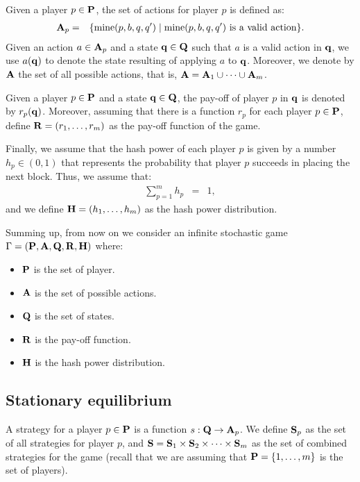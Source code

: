 \documentclass{article}
\begin{document}
Given a player $p \in \mathbf{P}$, the set of actions for player $p$ is defined as:
\begin{eqnarray*}
\mathbf{A}_p & = & \{ \text{mine}(p,b,q,q') \mid \text{mine}(p,b,q,q') \text{ is a valid action}\}.
\end{eqnarray*}
Given an action $a \in \mathbf{A}_p$ and a state $\mathbf{q} \in \mathbf{Q}$ such that $a$ is a valid action in $\mathbf{q}$, we use $a(\mathbf{q})$ to denote the state resulting of applying $a$ to $\mathbf{q}$. Moreover, we denote by $\mathbf{A}$ the set of all possible actions, that is, $\mathbf{A} = \mathbf{A}_1 \cup \cdots \cup \mathbf{A}_m$.

Given a player $p \in \mathbf{P}$ and a state $\mathbf{q} \in \mathbf{Q}$, the pay-off of player $p$ in $\mathbf{q}$ is denoted by $r_p(\mathbf{q})$. Moreover, assuming that there is a  function $r_p$ for each player $p \in \mathbf{P}$, define $\mathbf{R} = (r_1, \ldots, r_m)$ as the pay-off function of the game.

Finally, we assume that the hash power of each player $p$ is given by a number $h_p \in (0,1)$ that represents the probability that player $p$ succeeds in placing the next block. Thus, we assume that:
\begin{eqnarray*}
\sum_{p=1}^m h_p & = &  1, 
\end{eqnarray*}and we define $\mathbf{H} = (h_1, \ldots, h_m)$ as the hash power distribution.


Summing up, from now on we consider an infinite stochastic game $\Gamma = (\mathbf{P},\mathbf{A},\mathbf{Q},\mathbf{R},\mathbf{H})$ where:
\begin{itemize}
	\item $\mathbf{P}$ is the set of player.
	\item $\mathbf{A}$ is the set of possible actions.
	\item $\mathbf{Q}$ is the set of states.
	\item $\mathbf{R}$ is the pay-off function.
	\item $\mathbf{H}$ is the hash power distribution.
\end{itemize} 


\subsection{Stationary equilibrium}
A strategy for a player $p \in \mathbf{P}$ is a function $s : \mathbf{Q} \rightarrow \mathbf{A}_p$. 
We define $\mathbf{S}_p$ as the set of all strategies for player $p$, and $\mathbf{S} = \mathbf{S}_{1} \times \mathbf{S}_{2} \times \cdots \times \mathbf{S}_{m}$ as the set of combined strategies for the game (recall that we are assuming that $\mathbf{P} = \{1, \ldots, m\}$ is the set of players). 
\end{document}
